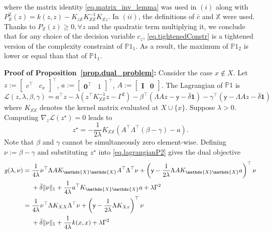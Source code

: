 \begin{my_proof}
\begin{subequations}
\begin{align}
		\end{align}
		\label{eq.quadraticDecomp}
	\end{subequations}
	where the matrix identity \eqref{eq.matrix_inv_lemma} was used in $(i)$ along with $P^2_{\mathds{X} }(z) = k(z,z) - K_{z \mathds{X} } K_{\mathds{X} \mathds{X} }^{-1} K_{\mathds{X} z}$. In $(ii)$, the definitions of $\bar c$ and $\mathds{X} $ were used. Thanks to $P_{\mathds{X} }(z) \geq 0, \forall z$ \citep{karvonen2022error} and the quadratic term multiplying it, we conclude that for any choice of the decision variable $c_z$, \eqref{eq.tightenedConstr} is a tightened version of the complexity constraint of $\mathds{P}1_1$. As a result, the maximum of $\mathds{P}1_2$ is lower or equal than that of $\mathds{P}1_1$. 
\end{my_proof}

\begin{my_proof}
	\textbf{Proof of Proposition~\ref{prop.dual_problem}:}
	Consider the case $x \not\in X$. Let $z := \begin{bmatrix} c^\top & c_x\end{bmatrix}^\top$, $a := \begin{bmatrix} \textbf{0}^\top & 1\end{bmatrix}^\top$, $A := \begin{bmatrix} \textbf{I} & \textbf{0}\end{bmatrix}$. The Lagrangian of $\mathds{P}1$ is
	\begin{equation}
		\label{eq.lagrangianP2}
		\mathcal{L}(z,\lambda,\beta,\gamma) = a^\top z - \lambda (z^\top K_{\mathds{X}\mathds{X}}^{-1}z - \Gamma^2) - \beta^\top(\Lambda Az - \mathsf{y} - \bar \delta \textbf{1})- \gamma^\top(\mathsf{y} -\Lambda Az - \bar \delta \textbf{1})
	\end{equation}
	where $K_{\mathds{X}\mathds{X}}$ denotes the kernel matrix evaluated at $X \cup \{x\}$. Suppose $\lambda > 0$. Computing $\nabla_z\mathcal{L}(z^\star) = 0$ leads to
	$$z^\star = -\frac{1}{2\lambda}K_{\mathds{X}\mathds{X}} \left( A^\top \Lambda^\top (\beta - \gamma) - a \right).$$ 
	Note that $\beta$ and $\gamma$ cannot be simultaneously zero element-wise. Defining $\nu := \beta - \gamma$ and substituting $z^\star$ into \eqref{eq.lagrangianP2} gives the dual objective
	\begin{align}\notag
		g(\lambda,\nu) 
		=\;& \frac{1}{4\lambda} \nu^\top \Lambda A K_{\mathds{X}\mathds{X}} A^\top \Lambda^\top \nu + \left(\mathsf{y} - \frac{1}{2\lambda} \Lambda A K_{\mathds{X}\mathds{X}} a \right)^\top \nu \\
		&+ \bar \delta \Vert \nu \Vert_1 +  \frac{1}{4\lambda} a^\top K_{\mathds{X}\mathds{X}} a + \lambda \Gamma^2 \\\notag
		=\;& \frac{1}{4\lambda} \nu^\top \Lambda K_{XX} \Lambda^\top \nu + \left(\mathsf{y} - \frac{1}{2\lambda} \Lambda K_{Xx} \right)^\top \nu \\
		&+ \bar \delta \Vert \nu \Vert_1 +  \frac{1}{4\lambda} k(x,x) + \lambda \Gamma^2 \label{eq.dualDerivation}
	\end{align}


\end{my_proof}
